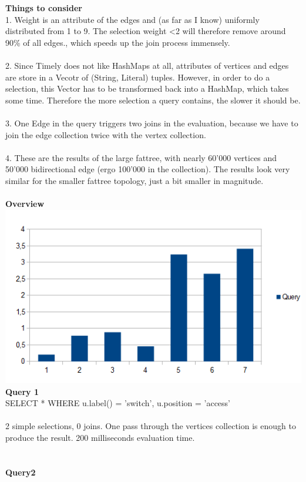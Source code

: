 \documentclass[11pt,singlecolumn]{scrartcl}
\begin{document}
\textbf{Things to consider}\\
1. Weight is an attribute of the edges and (as far as I know) uniformly distributed from 1 to 9. The selection weight \textless 2 will therefore remove around 90\% of all edges., which speeds up the join process immensely.\\\\
2. Since Timely does not like HashMaps at all, attributes of vertices and edges are store in a Vecotr of (String, Literal) tuples. However, in order to do a selection, this Vector has to be transformed back into a HashMap, which takes some time. Therefore  the more selection a query contains, the slower it should be.\\\\
3. One Edge in the query triggers two joins in the evaluation,  because we have to join the edge collection twice with the vertex collection.\\\\
4. These are the results of the large fattree, with nearly 60'000 vertices and 50'000 bidirectional edge (ergo 100'000 in the collection). The results look very similar for the smaller fattree topology, just a bit smaller in magnitude.\\\\
\textbf{Overview}\\
\includegraphics[width=1\textwidth]{fig1}
\\\textbf{Query 1}\\
SELECT * WHERE u.label() = 'switch', u.position = 'access'\\\\
2 simple selections, 0 joins. One pass through the vertices collection is enough to produce the result. 200 milliseconds evaluation time.
\\\\\\\textbf{Query2}\\
\end{document}
